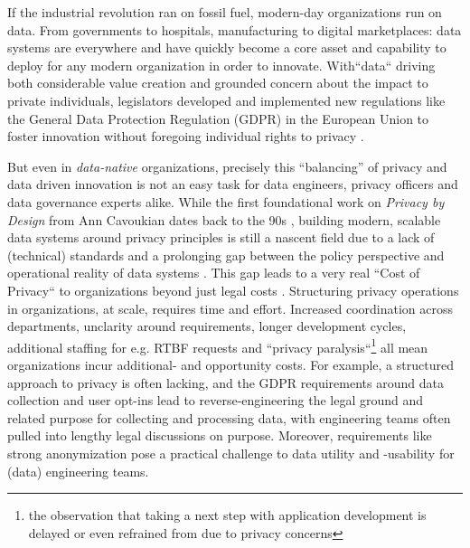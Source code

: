\documentclass[11pt]{article} %
\begin{document}
If the industrial revolution ran on fossil fuel, modern-day organizations run on data. From governments to hospitals, manufacturing to digital marketplaces: data systems are everywhere and have quickly become a core asset and capability to deploy for any modern organization in order to innovate. With``data`` driving both considerable value creation and grounded concern about the impact to private individuals, legislators developed and implemented new regulations like the General Data Protection Regulation (GDPR) \cite{GDPR} in the European Union to foster innovation without foregoing individual rights to privacy \cite{bridge2018} . 

But even in \textit{data-native} organizations, precisely this ``balancing'' of privacy and data driven innovation is not an easy task for data engineers, privacy officers and data governance experts alike. While the first foundational work on \textit{Privacy by Design} from Ann Cavoukian dates back to the 90s \cite{cavoukian1997}, building modern, scalable data systems around privacy principles is still a nascent field due to a lack of (technical) standards and a prolonging gap between the policy perspective and operational reality of data systems \cite{abiteboul2019transparency}. This gap leads to a very real ``Cost of Privacy`` to organizations beyond just legal costs \cite{bhajaria2022data}. Structuring privacy operations in organizations, at scale, requires time and effort. Increased coordination across departments, unclarity around requirements, longer development cycles, additional staffing for e.g. RTBF requests \cite{korenhof2015timing} and ``privacy paralysis``\footnote{the observation that taking a next step with application development is delayed or even refrained from due to privacy concerns} all mean organizations incur additional- and opportunity costs. For example, a structured approach to privacy is often lacking, and the GDPR requirements around data collection and user opt-ins lead to reverse-engineering the legal ground and related purpose for collecting and processing data, with engineering teams often pulled into lengthy legal discussions on purpose. Moreover, requirements like strong anonymization pose a practical challenge to data utility and -usability for (data) engineering teams. 
\end{document}
